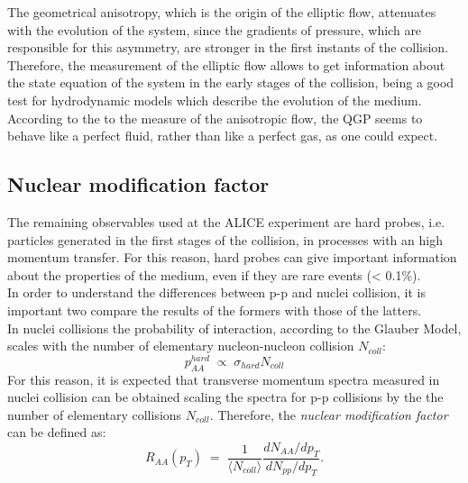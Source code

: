 The geometrical anisotropy, which is the origin of the elliptic flow, attenuates with the evolution of the system, since the gradients of pressure, which are responsible for this asymmetry, are stronger in the first instants of the collision. Therefore, the measurement of the elliptic flow allows to get information about the state equation of the system in the early stages of the collision, being a good test for hydrodynamic models which describe the evolution of the medium. According to the to the measure of the anisotropic flow, the QGP seems to behave like a perfect fluid, rather than like a perfect gas, as one could expect.\\
%
\subsection{Nuclear modification factor}
The remaining observables used at the ALICE experiment are hard probes, i.e. particles generated in the first stages of the collision, in processes with an high momentum transfer. For this reason, hard probes can give important information about the properties of the medium, even if they are rare events (< 0.1\%).\\
In order to understand the differences between p-p and nuclei collision, it is important two compare the results of the formers with those of the latters.\\
In nuclei collisions the probability of interaction, according to the Glauber Model, scales with the number of elementary nucleon-nucleon collision $N_{coll}$:
\begin{equation}
 p_{AA}^{hard}\;\propto\;\sigma_{hard}N_{coll}
\end{equation}
For this reason, it is expected that transverse momentum spectra measured in nuclei collision can be obtained scaling the spectra for p-p collisions by the the number of elementary collisions $N_{coll}$.
Therefore, the \textit{nuclear modification factor}  can be defined as:
\begin{equation}
 R_{AA}(p_{T})\;=\;\frac{1}{\langle N_{coll}\rangle}\frac{dN_{AA}/dp_{T}}{dN_{pp}/dp_{T}}.
\end{equation}
